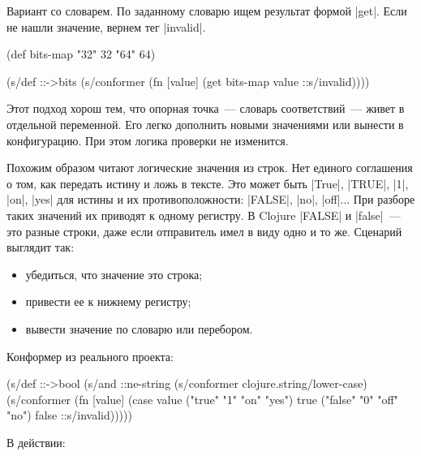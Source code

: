 Вариант со словарем. По заданному словарю ищем результат формой
\spverb|get|. Если не нашли значение, вернем тег \spverb|invalid|.

\begin{english}
  \begin{clojure}
(def bits-map {"32" 32 "64" 64})

(s/def ::->bits
  (s/conformer
   (fn [value]
     (get bits-map value ::s/invalid))))
  \end{clojure}
\end{english}

Этот подход хорош тем, что опорная точка~--- словарь соответствий~--- живет в
отдельной переменной. Его легко дополнить новыми значениями или вынести в
конфигурацию. При этом логика проверки не изменится.

Похожим образом читают логические значения из строк. Нет единого соглашения о
том, как передать истину и ложь в тексте. Это может быть \spverb|True|,
\spverb|TRUE|, \spverb|1|, \spverb|on|, \spverb|yes| для истины и их
противоположности: \spverb|FALSE|, \spverb|no|, \spverb|off|... При разборе
таких значений их приводят к одному регистру. В Clojure \spverb|FALSE| и
\spverb|false|~--- это разные строки, даже если отправитель имел в виду одно и
то же. Сценарий выглядит так:

\begin{itemize}

\item
  убедиться, что значение это строка;

\item
  привести ее к нижнему регистру;

\item
  вывести значение по словарю или перебором.

\end{itemize}

\noindent
Конформер из реального проекта:

\begin{english}
  \begin{clojure}
(s/def ::->bool
  (s/and
   ::ne-string
   (s/conformer clojure.string/lower-case)
   (s/conformer
    (fn [value]
      (case value
        ("true" "1" "on" "yes") true
        ("false" "0" "off" "no") false
        ::s/invalid)))))

  \end{clojure}
\end{english}

\noindent
В действии:

